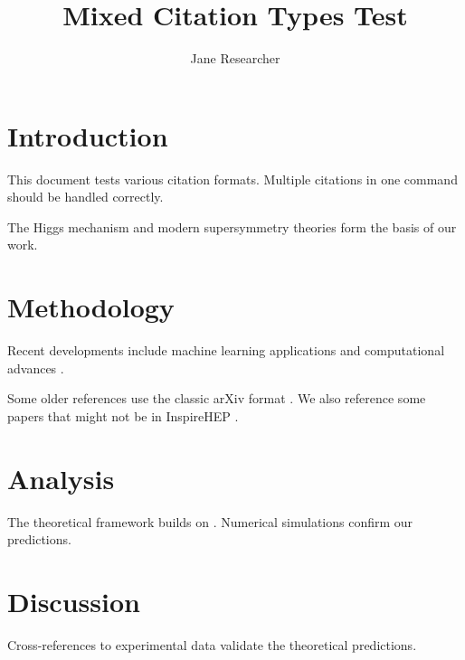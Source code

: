 \documentclass[12pt]{article}
\title{Mixed Citation Types Test}
\author{Jane Researcher}
\begin{document}
\maketitle

\section{Introduction}

This document tests various citation formats. Multiple citations in one command \cite{1724847,2112.00006,unknown_key_123} should be handled correctly.

The Higgs mechanism \cite{796859} and modern supersymmetry theories \cite{hep-th/9803103,1450044} form the basis of our work.

\section{Methodology}

Recent developments include machine learning applications \cite{2301.12345} and computational advances \cite{arXiv:2201.04502}. 

Some older references use the classic arXiv format \cite{astro-ph/0605709,gr-qc/0506127}. We also reference some papers that might not be in InspireHEP \cite{some_unknown_paper,another_missing_ref}.

\section{Analysis}

The theoretical framework builds on \cite{1724847,hep-th/9803103,mystery_citation_2023}. Numerical simulations \cite{2112.00006} confirm our predictions.

\section{Discussion}

Cross-references to experimental data \cite{1450044,2301.12345,weird_key_format} validate the theoretical predictions.

\end{document}
